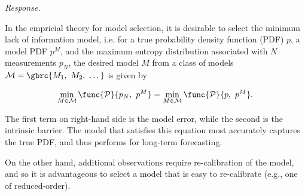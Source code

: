 \textit{Response.}

In the empricial theory for model selection, it is desirable to select the minimum lack of information model, i.e. for a true probability density function (PDF) $p$, a model PDF $p^M$, and the maximum entropy distribution associated with $N$ measurements $p_N$, the desired model $M$ from a class of models $\mathcal{M} = \gbrc{M_1,\ M_2,\ \dots}$ is given by

\begin{equation}
	\min_{M \in \mathcal{M}} \func{\mathcal{P}}{p_N,\ p^M} = \min_{M \in \mathcal{M}} \func{\mathcal{P}}{p,\ p^M}.
\end{equation}

The first term on right-hand side is the model error, while the second is the intrinsic barrier. The model that satisfies this equation most accurately captures the true PDF, and thus performs for long-term forecasting.

On the other hand, additional observations require re-calibration of the model, and so it is advantageous to select a model that is easy to re-calibrate (e.g., one of reduced-order). 

